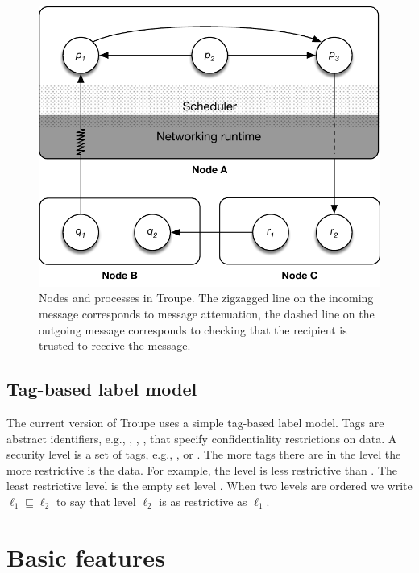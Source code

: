 \begin{figure}
\begin{center}
\includegraphics[width=0.5\columnwidth]{process_and_nodes}	
\end{center}
\caption{Nodes and processes in Troupe. The zigzagged line on the incoming message corresponds to message attenuation, the dashed line on the outgoing message corresponds to checking that the recipient is trusted to receive the message.
 \label{fig:troupe:architecture}}
\end{figure}



\subsection{Tag-based label model}
The current version of Troupe uses a simple tag-based label model.
Tags are abstract identifiers, e.g., , , ,
that specify confidentiality restrictions on data. 
A security level is a set of tags, e.g., 
, or 
.
The more tags there are in the level the more restrictive is the data. 
For example, the level 
 is less restrictive than 
. The least restrictive level is the 
empty set level \lev{}. When two levels are ordered we write 
$\ell_1 \sqsubseteq \ell_2$ to say that level $\ell_2$ is as restrictive 
as $\ell_1$.


%



\section{Basic features}


